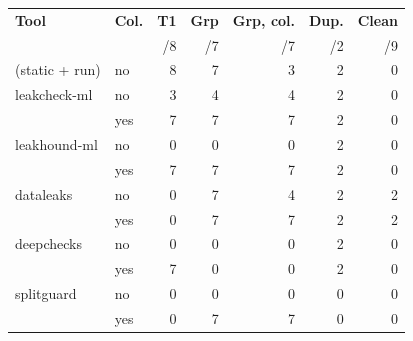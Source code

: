 \begin{tabular}{@{}llrrrrr@{}}
\toprule
\textbf{Tool} & \textbf{Col.} & \textbf{T1} & \textbf{Grp} & \textbf{Grp, col.} & \textbf{Dup.} & \textbf{Clean} \\
 & & /8 & /7 & /7 & /2 & /9 \\
\midrule
\tool{} (static + run) & no & 8 & 7 & 3 & 2 & 0 \\
\midrule
leakcheck-ml & no & 3 & 4 & 4 & 2 & 0 \\
 & yes & 7 & 7 & 7 & 2 & 0 \\
leakhound-ml & no & 0 & 0 & 0 & 2 & 0 \\
 & yes & 7 & 7 & 7 & 2 & 0 \\
dataleaks & no & 0 & 7 & 4 & 2 & 2 \\
 & yes & 0 & 7 & 7 & 2 & 2 \\
deepchecks & no & 0 & 0 & 0 & 2 & 0 \\
 & yes & 7 & 0 & 0 & 2 & 0 \\
splitguard & no & 0 & 0 & 0 & 0 & 0 \\
 & yes & 0 & 7 & 7 & 0 & 0 \\
\bottomrule
\end{tabular}
